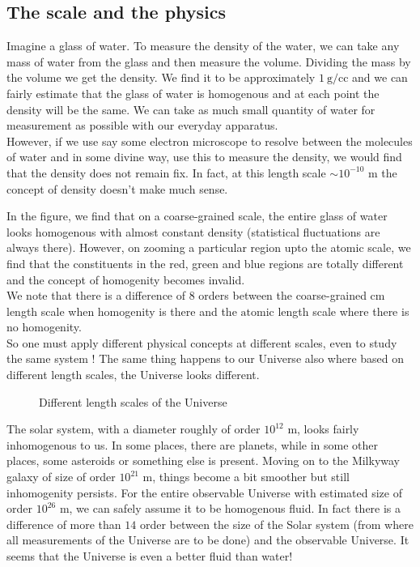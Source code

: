 \subsection{The scale and the physics}
Imagine a glass of water. To measure the density of the water, we can take any mass of water from the glass and then measure the volume. Dividing the mass by the volume we get the density. We find it to be approximately $1\ \mathrm{g}/\mathrm{cc}$ and we can fairly estimate that the glass of water is homogenous and at each point the density will be the same. We can take as much small quantity of water for measurement as possible with our everyday apparatus.\\[0.2cm] However, if we use say some electron microscope to resolve between the molecules of water and in some divine way, use this to measure the density, we would find that the density does not remain fix. In fact, at this length scale $\sim10^{-10}$ m the concept of density doesn't make much sense. 
\begin{figure}[H]
  \centering
    
\end{figure}
%     
\noindent
In the figure, we find that on a coarse-grained scale, the entire glass of water looks homogenous with almost constant density (statistical fluctuations are always there). However, on zooming a particular region upto the atomic scale, we find that the constituents in the red, green and blue regions are totally different and the concept of homogenity becomes invalid. \\[0.2cm]
We note that there is a difference of $8$ orders between the coarse-grained $\mathrm{cm}$ length scale when homogenity is there and the $\mathrm{atomic}$ length scale where there is no homogenity.\\[0.2cm]
So one must apply different physical concepts at different scales, even to study the same system ! The same thing happens to our Universe also where based on different length scales, the Universe looks different. 
\begin{figure}[H]
    \centering 
    
    \caption{Different length scales of the Universe}
\end{figure}
\noindent
The solar system, with a diameter roughly of order $10^{12}$ m, looks fairly inhomogenous to us. In some places, there are planets, while in some other places, some asteroids or something else is present. Moving on to the Milkyway galaxy of size of order $10^{21}$ m, things become a bit smoother but still inhomogenity persists. For the entire observable Universe with estimated size of order $10^{26}$ m, we can safely assume it to be homogenous fluid. In fact there is a difference of more than $14$ order between the size of the Solar system (from where all measurements of the Universe are to be done) and the observable Universe. It seems that the Universe is even a better fluid than water!
